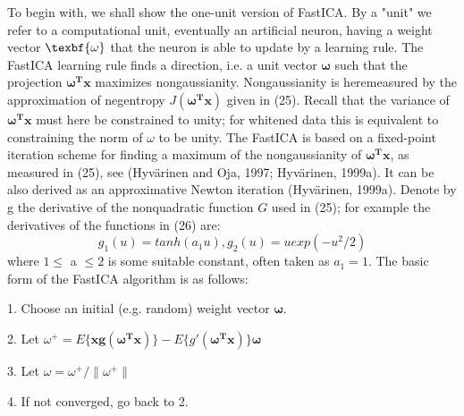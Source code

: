 To begin with, we shall show the one-unit version of FastICA. By a "unit" we refer to a computational unit,
eventually an artificial neuron, having a weight vector $\texbf{\omega}$ that the neuron is able to update by a learning rule. The
FastICA learning rule finds a direction, i.e. a unit vector $\mathbf{\omega}$ such that the projection $\mathbf{\omega^Tx}$ maximizes nongaussianity.
Nongaussianity is heremeasured by the approximation of negentropy $J\mathbf{(\omega^T x)}$ given in (25). Recall that the variance
of $\mathbf{\omega^T x}$ must here be constrained to unity; for whitened data this is equivalent to constraining the norm of $\omega$ to be
unity.
The FastICA is based on a fixed-point iteration scheme for finding a maximum of the nongaussianity of $\mathbf{\omega^Tx}$,
as measured in (25), see (Hyvärinen and Oja, 1997; Hyvärinen, 1999a). It can be also derived as an approximative
Newton iteration (Hyvärinen, 1999a). Denote by g the derivative of the nonquadratic function $G$ used in (25); for
example the derivatives of the functions in (26) are:
\begin{equation}
g_1(u)=tanh(a_1u), g_2(u)=uexp(-u^2/2)
\end{equation}
where $1\leq$ a $\leq2$ is some suitable constant, often taken as $a_1=1$. The basic form of the FastICA algorithm is as
follows:


1. Choose an initial (e.g. random) weight vector $\mathbf{\omega}$.


2. Let $\omega^+=E\{\mathbf{xg(\omega^T x)}\}-E\{g'(\mathbf{\omega^T x})\}\mathbf{\omega}$

3. Let $\omega=\omega^+/\|\omega^+\|$

4. If not converged, go back to 2. 

